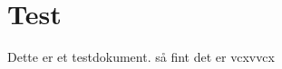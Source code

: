 \documentclass{article}
\begin{document}
\section{Test}
Dette er et testdokument. så fint det er vcxvvcx

\lipsum[1-2]
\end{document}
